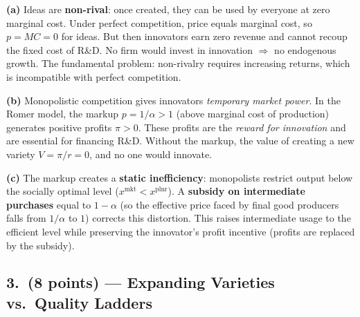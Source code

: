 \documentclass[a4paper,11pt]{article}
\begin{document}
\begin{answerbox}
\textbf{(a)} Ideas are \textbf{non-rival}: once created, they can be used by everyone at
zero marginal cost.  Under perfect competition, price equals marginal cost, so $p = MC = 0$
for ideas.  But then innovators earn zero revenue and cannot recoup the fixed cost of R\&D.
No firm would invest in innovation $\Rightarrow$ no endogenous growth.  The fundamental
problem: non-rivalry requires increasing returns, which is incompatible with perfect
competition.

\textbf{(b)} Monopolistic competition gives innovators \emph{temporary market power}.
In the Romer model, the markup $p = 1/\alpha > 1$ (above marginal cost of production)
generates positive profits $\pi > 0$.  These profits are the \emph{reward for innovation}
and are essential for financing R\&D.  Without the markup, the value of creating a new
variety $V = \pi/r = 0$, and no one would innovate.

\textbf{(c)} The markup creates a \textbf{static inefficiency}: monopolists restrict
output below the socially optimal level ($x^{\text{mkt}} < x^{\text{plnr}}$).  A
\textbf{subsidy on intermediate purchases} equal to $1 - \alpha$ (so the effective price
faced by final good producers falls from $1/\alpha$ to $1$) corrects this distortion.
This raises intermediate usage to the efficient level while preserving the innovator's
profit incentive (profits are replaced by the subsidy).
\end{answerbox}

\subsection*{3.\ (8 points) --- Expanding Varieties vs.\ Quality Ladders}
\end{document}
